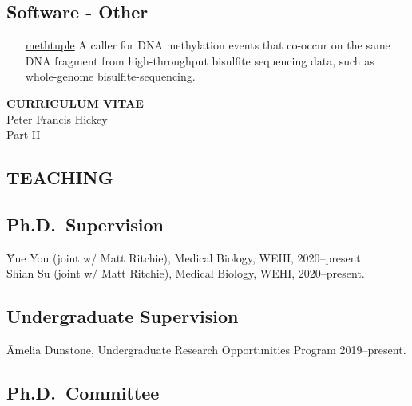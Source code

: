 \documentclass[11pt,letterpaper,pdf]{article}
\begin{document}
\subsection*{Software - Other}

\begin{enumerate}[labelindent=1cm,align=left]
  \item[\href{https://pypi.python.org/pypi/methtuple/}{methtuple}] A caller for DNA methylation events that co-occur on the same DNA fragment from high-throughput bisulfite sequencing data, such as whole-genome bisulfite-sequencing.
\end{enumerate}


\newpage

\begin{center}
{\bf CURRICULUM VITAE}\\
Peter Francis Hickey\\[3mm]
Part II
\end{center}

\bigskip


\subsection*{TEACHING}

\subsection*{Ph.D.\ Supervision}

\begin{tabbing}
 \=Yue You (joint w/ Matt Ritchie), Medical Biology, WEHI, 2020--present.\\
 \>Shian Su (joint w/ Matt Ritchie), Medical Biology, WEHI, 2020--present.\\
\end{tabbing}

\subsection*{Undergraduate Supervision}

\begin{tabbing}
  \=Amelia Dunstone, Undergraduate Research Opportunities Program 2019--present.\\
\end{tabbing}

\subsection*{Ph.D.\ Committee}
\end{document}
